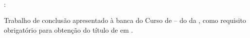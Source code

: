 %
%

\makeatletter
\begin{folhadeaprovacao}

\thispagestyle{empty}%
	
	\begin{center}
    
		\small\textbf{\expandafter\uppercase\expandafter{\imprimirnomeautor}}\\
		\vspace*{8.2 cm}%
		\normalsize\textbf{\expandafter\uppercase\expandafter{\imprimirtitulotb}}{:}
		\normalsize\textbf{\expandafter\uppercase\expandafter{\imprimirsubtitulo}}\\
    \end{center}
	
	\vspace*{0.35 cm}%
		    \large%
    		\hfill%
	    	\begin{minipage}{8 cm}%
	    		\begin{small} %
	    		\setlength{\baselineskip}{0.7\baselineskip}
				
				{Trabalho de conclusão apresentado à banca do Curso de {\imprimircurso} – {\imprimirprograma } do {\imprimirdepartamento} da {\imprimirinstituicao}, como requisito obrigatório para obtenção do título de {\imprimirgrau} em {\imprimircurso}.}\\
				
				\end{small} %
		    \end{minipage}%
		    	
		    	
		    \vspace*{0.6 cm}%
		    
		    \large%
    		\hfill%
	    	 
		    
		    \normalsize %
		    \vspace*{1.5 cm}%
		    
		    
		    \\
			

\end{folhadeaprovacao}
